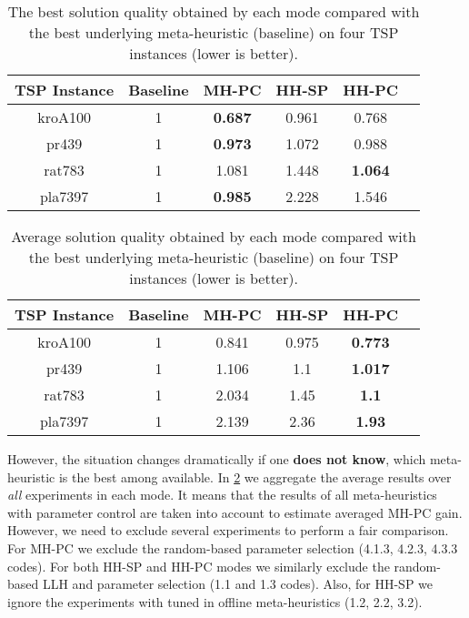 \begin{samepage}
	\begin{table}[!htbp]
		\caption{The best solution quality obtained by each mode compared with the best underlying meta-heuristic (baseline) on four TSP instances (lower is better).}
		\label{eval:1: best final results comparison table}
		\begin{tabular}{cccccc}
			\hline
			\rowcolor{gray!10}
			\textbf{TSP Instance} & \textbf{Baseline} & \textbf{MH-PC} & \textbf{HH-SP} & \textbf{HH-PC} \\
			\hline		
			kroA100 & 1 & \textbf{0.687} & 0.961 & 0.768 \\
			pr439 & 1 & \textbf{0.973} & 1.072 & 0.988 \\
			rat783 	& 1 & 1.081 & 1.448 & \textbf{1.064} \\
			pla7397 & 1 & \textbf{0.985} & 2.228 & 1.546 \\
			\hline
		\end{tabular}
	\end{table}
	
	
	\begin{table}[!htbp]
		\caption{Average solution quality obtained by each mode compared with the best underlying meta-heuristic (baseline) on four TSP instances (lower is better).}
		\label{eval:1: avg final results comparison table}
		\begin{tabular}{cccccc}
			\hline
			\rowcolor{gray!10}
			\textbf{TSP Instance} & \textbf{Baseline} & \textbf{MH-PC} & \textbf{HH-SP} & \textbf{HH-PC} \\
			\hline		
			kroA100 & 1 & 0.841 & 0.975 & \textbf{0.773} \\
			pr439 & 1 & 1.106 & 1.1 & \textbf{1.017} \\
			rat783 	& 1 & 2.034 & 1.45 & \textbf{1.1} \\
			pla7397 & 1 & 2.139 & 2.36 & \textbf{1.93} \\
			\hline
		\end{tabular}
	\end{table}
\end{samepage}

However, the situation changes dramatically if one \textbf{does not know}, which meta-heuristic is the best among available. In \cref{eval:1: avg final results comparison table} we aggregate the average results over \emph{all} experiments in each mode. It means that the results of all meta-heuristics with parameter control are taken into account to estimate averaged MH-PC gain. However, we need to exclude several experiments to perform a fair comparison. For MH-PC we exclude the random-based parameter selection (4.1.3, 4.2.3, 4.3.3 codes). For both HH-SP and HH-PC modes we similarly exclude the random-based LLH and parameter selection (1.1 and 1.3 codes). Also, for HH-SP we ignore the experiments with tuned in offline meta-heuristics (1.2, 2.2, 3.2).

